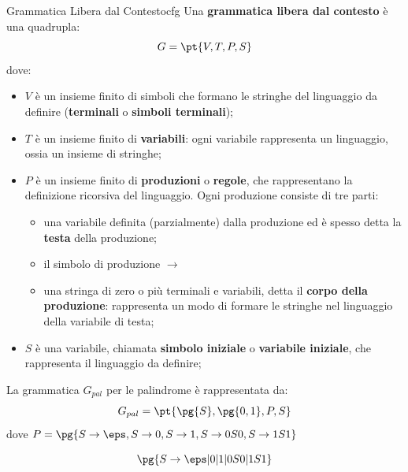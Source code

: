 \begin{definition}{Grammatica Libera dal Contesto}{cfg}
    Una \textbf{grammatica libera dal contesto} è una quadrupla:
    \[
        G = \pt{V,T,P,S}
    \]
    dove:
    \begin{itemize}
        \item $V$ è un insieme finito di simboli che formano le stringhe del linguaggio da definire (\textbf{terminali} o \textbf{simboli terminali});
        \item $T$ è un insieme finito di \textbf{variabili}: ogni variabile rappresenta un linguaggio, ossia un insieme di stringhe;
        \item $P$ è un insieme finito di \textbf{produzioni} o \textbf{regole}, che rappresentano la definizione ricorsiva del linguaggio.
            Ogni produzione consiste di tre parti:
            \begin{itemize}
                \item una variabile definita (parzialmente) dalla produzione ed è spesso detta la \textbf{testa} della produzione;
                \item il simbolo di produzione $\to$
                \item una stringa di zero o più terminali e variabili, detta il \textbf{corpo della produzione}: rappresenta un modo di formare le stringhe nel linguaggio della variabile di testa;
            \end{itemize}
        \item $S$ è una variabile, chiamata \textbf{simbolo iniziale} o \textbf{variabile iniziale}, che rappresenta il linguaggio da definire;
    \end{itemize}
\end{definition}
\begin{example}{}{}
    La grammatica $G_{pal}$ per le palindrome è rappresentata da:
    \[
        G_{pal} = \pt{\pg{S},\pg{0,1},P,S}
    \]
    dove $P = \pg{S\to\eps,S\to0,S\to1,S\to0S0,S\to1S1}$
    \begin{note}
        \[
            \pg{S \to \eps|0|1|0S0|1S1}
        \]
    \end{note}
\end{example}
